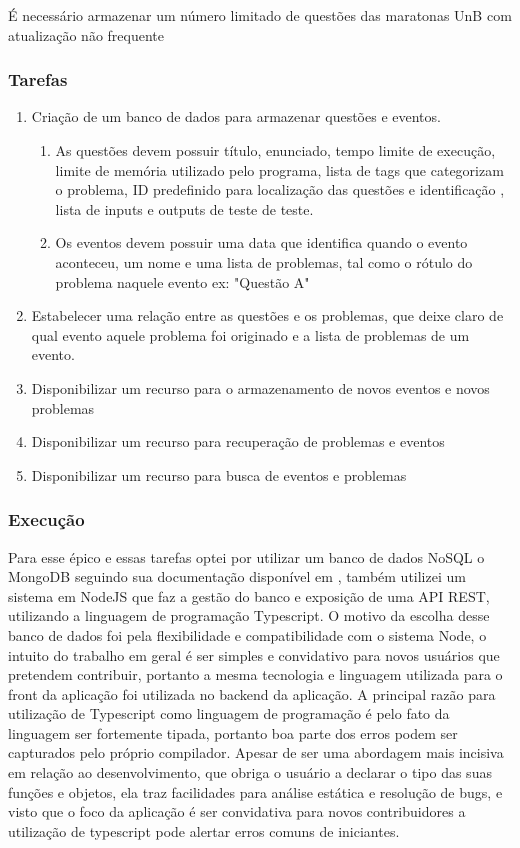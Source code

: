 É necessário armazenar um número limitado de questões das maratonas UnB com atualização não frequente

\subsubsection{Tarefas}

\begin{enumerate}
    \item Criação de um banco de dados para armazenar questões e eventos.
          \begin{enumerate}
              \item As questões devem possuir título, enunciado, tempo limite de execução, limite de memória utilizado pelo programa, lista de tags que categorizam o problema, ID predefinido para localização das questões e identificação , lista de inputs e outputs de teste de teste.
              \item Os eventos devem possuir uma data que identifica quando o evento aconteceu, um nome e uma lista de problemas, tal como o rótulo do problema naquele evento ex: "Questão A"
          \end{enumerate}
    \item Estabelecer uma relação entre as questões e os problemas, que deixe claro de qual evento aquele problema foi originado e a lista de problemas de um evento.
    \item Disponibilizar um recurso para o armazenamento de novos eventos e novos problemas
    \item Disponibilizar um recurso para recuperação de problemas e eventos
    \item Disponibilizar um recurso para busca de eventos e problemas
\end{enumerate}



\subsubsection{Execução}

Para esse épico e essas tarefas optei por utilizar um banco de dados NoSQL o MongoDB seguindo sua documentação disponível em \cite{doc:mongodb}, também utilizei um sistema em NodeJS que faz a gestão do banco e exposição de uma API REST, utilizando a linguagem de programação Typescript.
O motivo da escolha desse banco de dados foi pela flexibilidade e compatibilidade com o sistema Node, o intuito do trabalho em geral é ser simples e convidativo para novos usuários que pretendem contribuir, portanto a mesma tecnologia e linguagem utilizada para o front da aplicação foi utilizada no backend da aplicação.
A principal razão para utilização de Typescript como linguagem de programação é pelo fato da linguagem ser fortemente tipada, portanto boa parte dos erros podem ser capturados pelo próprio compilador. Apesar de ser uma abordagem mais incisiva em relação ao desenvolvimento, que obriga o usuário a declarar o tipo das suas funções e objetos, ela traz facilidades para análise estática e resolução de bugs, e visto que o foco da aplicação é ser convidativa para novos contribuidores a utilização de typescript pode alertar erros comuns de iniciantes.

